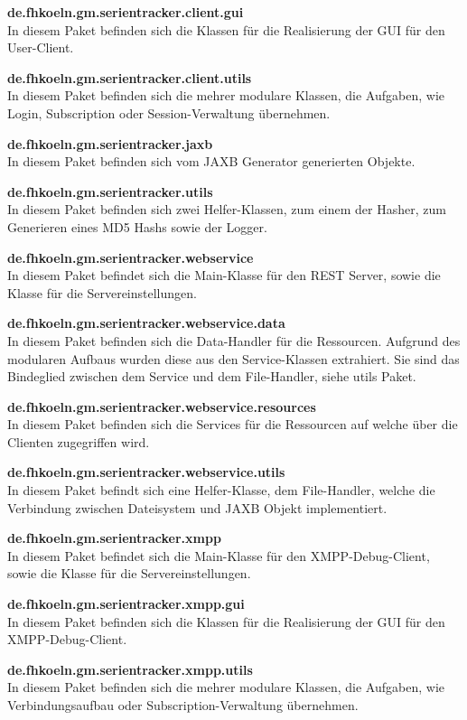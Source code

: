 \textbf{de.fhkoeln.gm.serientracker.client.gui}\\
In diesem Paket befinden sich die Klassen für die Realisierung der GUI für den User-Client.

\textbf{de.fhkoeln.gm.serientracker.client.utils}\\
In diesem Paket befinden sich die mehrer modulare Klassen, die Aufgaben, wie Login, Subscription oder Session-Verwaltung übernehmen.

\textbf{de.fhkoeln.gm.serientracker.jaxb}\\
In diesem Paket befinden sich vom JAXB Generator generierten Objekte.

\textbf{de.fhkoeln.gm.serientracker.utils}\\
In diesem Paket befinden sich zwei Helfer-Klassen, zum einem der Hasher, zum Generieren eines MD5 Hashs sowie der Logger.

\textbf{de.fhkoeln.gm.serientracker.webservice}\\
In diesem Paket befindet sich die Main-Klasse für den REST Server, sowie die Klasse für die Servereinstellungen.

\textbf{de.fhkoeln.gm.serientracker.webservice.data}\\
In diesem Paket befinden sich die Data-Handler für die Ressourcen. Aufgrund des modularen Aufbaus wurden diese aus den Service-Klassen extrahiert. Sie sind das Bindeglied zwischen dem Service und dem File-Handler, siehe utils Paket.

\textbf{de.fhkoeln.gm.serientracker.webservice.resources}\\
In diesem Paket befinden sich die Services für die Ressourcen auf welche über die Clienten zugegriffen wird.

\textbf{de.fhkoeln.gm.serientracker.webservice.utils}\\
In diesem Paket befindt sich eine Helfer-Klasse, dem File-Handler, welche die Verbindung zwischen Dateisystem und JAXB Objekt implementiert.

\textbf{de.fhkoeln.gm.serientracker.xmpp}\\
In diesem Paket befindet sich die Main-Klasse für den XMPP-Debug-Client, sowie die Klasse für die Servereinstellungen.

\textbf{de.fhkoeln.gm.serientracker.xmpp.gui}\\
In diesem Paket befinden sich die Klassen für die Realisierung der GUI für den XMPP-Debug-Client.

\textbf{de.fhkoeln.gm.serientracker.xmpp.utils}\\
In diesem Paket befinden sich die mehrer modulare Klassen, die Aufgaben, wie Verbindungsaufbau oder Subscription-Verwaltung übernehmen.

